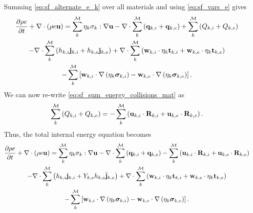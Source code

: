 \documentclass[a4paper,11pt]{report}
\begin{document}
Summing \cref{eq:sf_alternate_e_k} over all materials and using \cref{eq:sf_vars_e} gives
\begin{multline*}
    \frac{\partial \rho e}{\partial t} + \nabla \cdot \left( \rho e \mathbf{u} \right) = \sum_k^\mathcal{M} \eta_k \sigma_k : \nabla \mathbf{u} - \nabla \cdot \sum_k^\mathcal{M} \left( \mathbf{q}_{k,i} + \mathbf{q}_{k,e} \right) + \sum_k^\mathcal{M} \left( Q_{k,i} + Q_{k,e} \right) \\
    - \nabla \cdot \sum_k^\mathcal{M} \left( h_{k,i} \mathbf{j}_{k,i} + h_{k,e} \mathbf{j}_{k,e} \right) + \nabla \cdot \sum_k^\mathcal{M} \left( \mathbf{w}_{k,i} \cdot \eta_k \mathbf{t}_{k,i} + \mathbf{w}_{k,e} \cdot \eta_k \mathbf{t}_{k,e} \right) \\
    - \sum_k^\mathcal{M} \left[ \mathbf{w}_{k,i} \cdot \nabla \left( \eta_k \bm \sigma_{k,i} \right) - \mathbf{w}_{k,e} \cdot \nabla \left( \eta_k \bm \sigma_{k,e} \right) \right].
\end{multline*}
We can now re-write \cref{eq:sf_sum_energy_collisions_mat} as 
\begin{equation}
    \sum_k^\mathcal{M} \left( Q_{k,i} + Q_{k,e} \right) = -\sum_k^\mathcal{M} \left( \mathbf{u}_{k,i} \cdot \mathbf{R}_{k,i} + \mathbf{u}_{k,e} \cdot \mathbf{R}_{k,e} \right).
\end{equation}
Thus, the total internal energy equation becomes
\begin{multline*}
    \frac{\partial \rho e}{\partial t} + \nabla \cdot \left( \rho e \mathbf{u} \right) = \sum_k^\mathcal{M} \eta_k \sigma_k : \nabla \mathbf{u} - \nabla \cdot \sum_k^\mathcal{M} \left( \mathbf{q}_{k,i} + \mathbf{q}_{k,e} \right) -\sum_k^\mathcal{M} \left( \mathbf{u}_{k,i} \cdot \mathbf{R}_{k,i} + \mathbf{u}_{k,e} \cdot \mathbf{R}_{k,e} \right) \\
    - \nabla \cdot \sum_k^\mathcal{M} \left( h_{k,i} \mathbf{j}_{k,i} + Y_{k,e} h_{k,e} \bar{\mathbf{j}}_{k,e} \right) + \nabla \cdot \sum_k^\mathcal{M} \left( \mathbf{w}_{k,i} \cdot \eta_k \mathbf{t}_{k,i} + \mathbf{w}_{k,e} \cdot \eta_k \mathbf{t}_{k,e} \right) \\
    - \sum_k^\mathcal{M} \left[ \mathbf{w}_{k,i} \cdot \nabla \left( \eta_k \bm \sigma_{k,i} \right) - \mathbf{w}_{k,e} \cdot \nabla \left( \eta_k \bm \sigma_{k,e} \right) \right].
\end{multline*}
\end{document}
